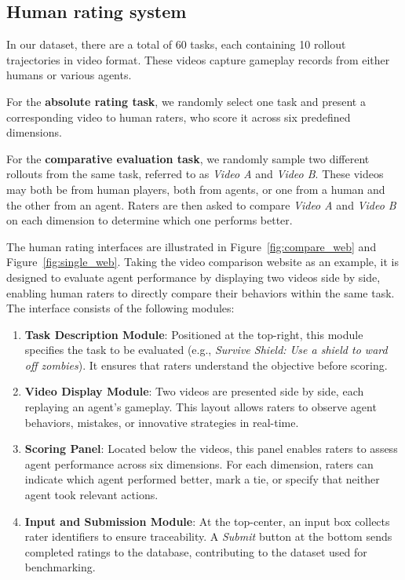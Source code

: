 \subsection{Human rating system}

In our dataset, there are a total of 60 tasks, each containing 10 rollout trajectories in video format. These videos capture gameplay records from either humans or various agents. 

For the \textbf{absolute rating task}, we randomly select one task and present a corresponding video to human raters, who score it across six predefined dimensions. 

For the \textbf{comparative evaluation task}, we randomly sample two different rollouts from the same task, referred to as \textit{Video A} and \textit{Video B}. These videos may both be from human players, both from agents, or one from a human and the other from an agent. Raters are then asked to compare \textit{Video A} and \textit{Video B} on each dimension to determine which one performs better. 

The human rating interfaces are illustrated in Figure~\ref{fig:compare_web} and Figure~\ref{fig:single_web}. Taking the video comparison website as an example, it is designed to evaluate agent performance by displaying two videos side by side, enabling human raters to directly compare their behaviors within the same task. The interface consists of the following modules:

\begin{enumerate}
    \item \textbf{Task Description Module}: Positioned at the top-right, this module specifies the task to be evaluated (e.g., \textit{Survive Shield: Use a shield to ward off zombies}). It ensures that raters understand the objective before scoring.  

    \item \textbf{Video Display Module}: Two videos are presented side by side, each replaying an agent’s gameplay. This layout allows raters to observe agent behaviors, mistakes, or innovative strategies in real-time.  

    \item \textbf{Scoring Panel}: Located below the videos, this panel enables raters to assess agent performance across six dimensions. For each dimension, raters can indicate which agent performed better, mark a tie, or specify that neither agent took relevant actions.

    \item \textbf{Input and Submission Module}: At the top-center, an input box collects rater identifiers to ensure traceability. A \textit{Submit} button at the bottom sends completed ratings to the database, contributing to the dataset used for benchmarking.  
\end{enumerate} 


